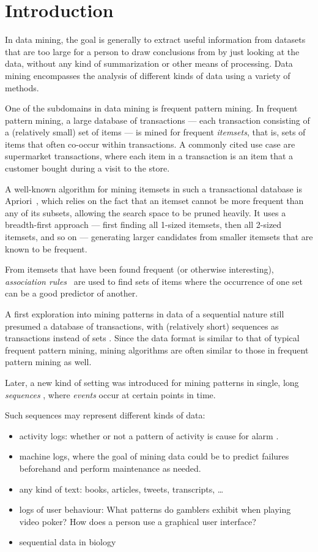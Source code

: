 \chapter{Introduction}

In data mining, the goal is generally to extract useful information from datasets that are too large for a person to draw conclusions from by just looking at the data, without any kind of summarization or other means of processing. Data mining encompasses the analysis of different kinds of data using a variety of methods.

One of the subdomains in data mining is frequent pattern mining. In frequent pattern mining, a large database of transactions --- each transaction consisting of a (relatively small) set of items --- is mined for frequent \emph{itemsets}, that is, sets of items that often co-occur within transactions. A commonly cited use case are supermarket transactions, where each item in a transaction is an item that a customer bought during a visit to the store.

A well-known algorithm for mining itemsets in such a transactional database is Apriori~\citep{agrawal1994fast}, which relies on the fact that an itemset cannot be more frequent than any of its subsets, allowing the search space to be pruned heavily. It uses a breadth-first approach --- first finding all 1-sized itemsets, then all 2-sized itemsets, and so on --- generating larger candidates from smaller itemsets that are known to be frequent.

From itemsets that have been found frequent (or otherwise interesting), \emph{association rules}~\cite{agrawal1994fast} are used to find sets of items where the occurrence of one set can be a good predictor of another.

A first exploration into mining patterns in data of a sequential nature still presumed a database of transactions, with (relatively short) sequences as transactions instead of sets \citep{agrawal1995mining}.
Since the data format is similar to that of typical frequent pattern mining, mining algorithms are often similar to those in frequent pattern mining as well.

Later, a new kind of setting was introduced for mining patterns in single, long \emph{sequences} \citep{mannila1997discovery}, where \emph{events} occur at certain points in time.

Such sequences may represent different kinds of data:
\begin{itemize}
\item activity logs: whether or not a pattern of activity is cause for alarm \cite{mannila1997discovery}.
\item machine logs, where the goal of mining data could be to predict failures beforehand and perform maintenance as needed.
\item any kind of text: books, articles, tweets, transcripts, \ldots
\item logs of user behaviour: What patterns do gamblers exhibit when playing video poker? How does a person use a graphical user interface?
\item sequential data in biology \cite{biosequences}
\end{itemize}

